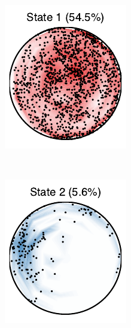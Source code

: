 \documentclass[aos,noinfoline]{imsart} %
\begin{document}
\begin{figure}[t!]
  \centering%
  \begin{subfigure}[T]{1.2in}
    \includegraphics[width=\textwidth]{state1}
  \end{subfigure}
  ~
  \begin{subfigure}[T]{1.2in}
    \includegraphics[width=\textwidth]{state2}

\end{subfigure}
\end{figure}
\end{document}
